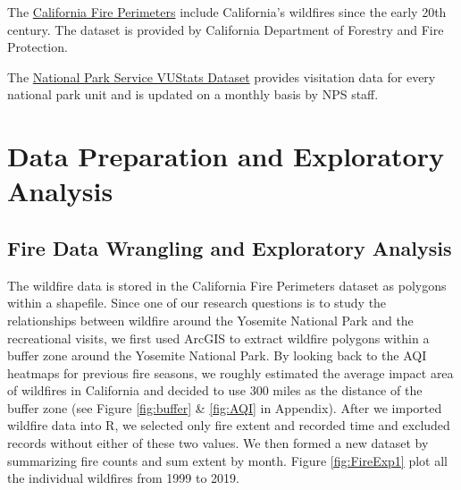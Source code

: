 \documentclass[
  12pt,
]{article}
\begin{document}
The \href{https://gis.data.ca.gov/datasets/CALFIRE-Forestry::california-fire-perimeters-all/explore?location=37.260012\%2C-118.992700\%2C6.00\&showTable=true}{California Fire Perimeters} include California's wildfires since the early 20th century. The dataset is provided by California Department of Forestry and Fire Protection.

The \href{https://irma.nps.gov/STATS/Reports/Park/YOSE}{National Park Service VUStats Dataset} provides visitation data for every national park unit and is updated on a monthly basis by NPS staff.

\hypertarget{data-preparation-and-exploratory-analysis}{%
\section{Data Preparation and Exploratory Analysis}\label{data-preparation-and-exploratory-analysis}}

\hypertarget{fire-data-wrangling-and-exploratory-analysis}{%
\subsection{Fire Data Wrangling and Exploratory Analysis}\label{fire-data-wrangling-and-exploratory-analysis}}

The wildfire data is stored in the California Fire Perimeters dataset as polygons within a shapefile. Since one of our research questions is to study the relationships between wildfire around the Yosemite National Park and the recreational visits, we first used ArcGIS to extract wildfire polygons within a buffer zone around the Yosemite National Park. By looking back to the AQI heatmaps for previous fire seasons, we roughly estimated the average impact area of wildfires in California and decided to use 300 miles as the distance of the buffer zone (see Figure \ref{fig:buffer} \& \ref{fig:AQI} in Appendix).
After we imported wildfire data into R, we selected only fire extent and recorded time and excluded records without either of these two values. We then formed a new dataset by summarizing fire counts and sum extent by month.
Figure \ref{fig:FireExp1} plot all the individual wildfires from 1999 to 2019.
\end{document}
